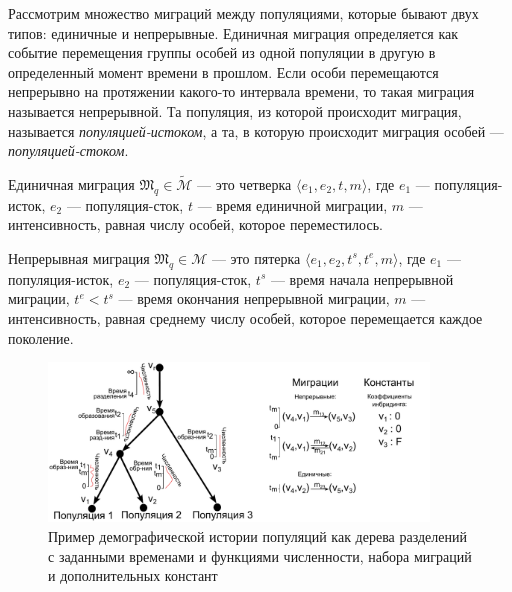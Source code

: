 Рассмотрим множество миграций между популяциями, которые бывают двух типов: единичные и непрерывные.
Единичная миграция определяется как событие перемещения группы особей из одной популяции в другую в определенный момент времени в прошлом.
Если особи перемещаются непрерывно на протяжении какого-то интервала времени, то такая миграция называется непрерывной.
Та популяция, из которой происходит миграция, называется \emph{популяцией-истоком}, а та, в которую происходит миграция особей --- \emph{популяцией-стоком}.

 Единичная миграция $\mathfrak{M}_q \in \widetilde{\mathscr{M}}$ --- это четверка ${ \langle e_1, e_2, t, m \rangle}$, где $e_1$ --- популяция-исток, $e_2$ --- популяция-сток, $t$ --- время единичной миграции, $m$ --- интенсивность, равная числу особей, которое переместилось.

 Непрерывная миграция $\mathfrak{M}_q \in \mathscr{M}$ --- это пятерка ${\langle e_1, e_2, t^s, t^e, m\rangle}$, где $e_1$ --- популяция-исток, $e_2$ --- популяция-сток, $t^s$ --- время начала непрерывной миграции,  $t^e < t^s$ --- время окончания непрерывной миграции, $m$ --- интенсивность, равная среднему числу особей, которое перемещается каждое поколение.


\begin{figure}[ht]
    \centering
    \includegraphics[width=0.9\textwidth]{images_2/dem_hist_def_2.pdf}
    \caption{Пример демографической истории популяций как дерева разделений с заданными временами и функциями численности, набора миграций и дополнительных констант}
    \label{fig:dem_def}
\end{figure}


